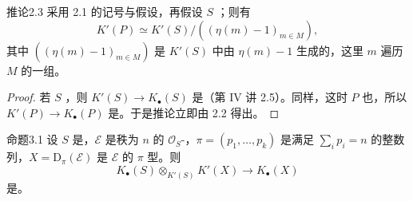 \begin{SGAresult}{推论}{2.3}
采用 2.1 的记号与假设，再假设 $S$ ；则有
\[
K'(P)\simeq K'(S)/((\eta(m)-1)_{m\in M}),
\]
其中 $((\eta(m)-1)_{m\in M})$ 是 $K'(S)$ 中由 $\eta(m)-1$ 生成的，这里 $m$ 遍历 $M$ 的一组。
\end{SGAresult}
\begin{proof}
若 $S$ ，则 $K'(S)\to K_\bullet(S)$ 是（第 IV 讲 2.5）。同样，这时 $P$ 也，所以 $K'(P)\to K_\bullet(P)$ 是。于是推论立即由 2.2 得出。
\end{proof}

\begin{SGAresult}{命题}{3.1}
设 $S$ 是，$\mathcal E$ 是秩为 $n$ 的 $\mathcal O_S$-，$\pi=(p_1,\ldots,p_k)$ 是满足 $\sum_i p_i=n$ 的整数列，$X=\mathrm D_\pi(\mathcal E)$ 是 $\mathcal E$ 的 $\pi$ 型。则
\[
K_\bullet(S)\otimes_{K'(S)}K'(X)\longrightarrow K_\bullet(X)
\]
是。
\end{SGAresult}
